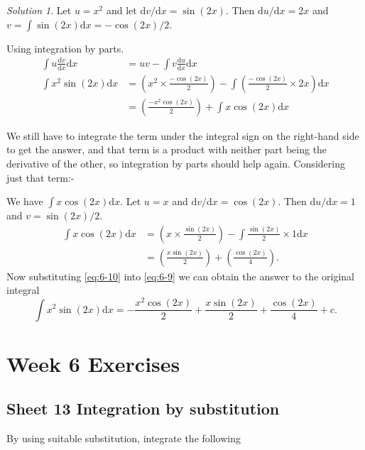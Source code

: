 \documentclass[
  11pt,
  oneside]{book}
\newcommand{\slide}{}
\theoremstyle{definition}
\theoremstyle{definition}
\theoremstyle{definition}
\theoremstyle{definition}
\theoremstyle{remark}
\newtheorem*{solution}{Solution}
\begin{document}
\begin{solution}
Let \(u = x^2\) and let \(\mathrm{d}v/\mathrm{d}x = \sin(2x)\). Then \(\mathrm{d}u/\mathrm{d}x = 2x\) and \(v = \displaystyle\int \sin(2x)\mathrm{d}x = -\cos(2x)/2\).

Using integration by parts.
\begin{align}
\int u\frac{\mathrm{d}v}{\mathrm{d}x}\mathrm{d}x& = uv-\int v\frac{\mathrm{d}u}{\mathrm{d}x}\mathrm{d}x\\
\int x^2\sin(2x)\mathrm{d}x&=\left(x^2\times\frac{-\cos(2x)}{2}\right)-\int\left(\frac{-\cos(2x)}{2}\times2x\right)\mathrm{d}x\\
&=\left(\frac{-x^2\cos(2x)}{2}\right)+\int x\cos(2x)\mathrm{d}x
\label{eq:6-9}
\end{align}

We still have to integrate the term under the integral sign on the right-hand side to get the answer, and that term is a product with neither part being the derivative of the other, so integration by parts should help again. Considering just that term:-

\slide

We have \(\displaystyle\int x\cos(2x)\mathrm{d}x\). Let \(u=x\) and \(\mathrm{d}v/\mathrm{d}x = \cos(2x)\). Then \(\mathrm{d}u/\mathrm{d}x = 1\) and \(v=\sin(2x)/2\).
\begin{align}
\int x\cos(2x)\mathrm{d}x &= \left(x\times\frac{\sin(2x)}{2}\right) - \int\frac{\sin(2x)}{2}\times1\mathrm{d}x\\
&= \left(\frac{x\sin(2x)}2\right)+\left(\frac{\cos(2x)}4\right).
\label{eq:6-10}
\end{align}
Now substituting \eqref{eq:6-10} into \eqref{eq:6-9} we can obtain the answer to the original integral
\[
\int x^2\sin(2x)\mathrm{d}x = -\frac{x^2\cos(2x)}2+\frac{x\sin(2x)}2+\frac{\cos(2x)}4 + c.
\]
\end{solution}

\chapter*{Week 6 Exercises}\label{week-6-exercises}

\section{Sheet 13 Integration by substitution}\label{sheet-13-integration-by-substitution}

By using suitable substitution, integrate the following
\end{document}
